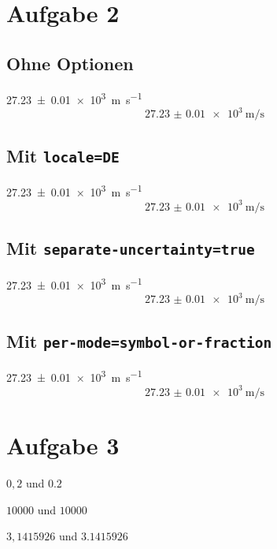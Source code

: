 \documentclass{scrartcl}
\begin{document}
\section*{Aufgabe 2}

\subsection*{Ohne Optionen}

\qty{27.23(1)e3}{\meter\per\second}
\begin{equation}
  \qty{27.23(1)e3}{\meter\per\second}
\end{equation}

\subsection*{Mit \texttt{locale=DE}}

\qty{27.23(1)e3}{\meter\per\second}
\begin{equation}
  \qty{27.23(1)e3}{\meter\per\second}
\end{equation}

\subsection*{Mit \texttt{separate-uncertainty=true}}

\qty{27.23(1)e3}{\meter\per\second}
\begin{equation}
  \qty{27.23(1)e3}{\meter\per\second}
\end{equation}

\subsection*{Mit \texttt{per-mode=symbol-or-fraction}}

\qty{27.23(1)e3}{\meter\per\second}
\begin{equation}
  \qty{27.23(1)e3}{\meter\per\second}
\end{equation}

\section*{Aufgabe 3}

$0,2$ und $\num{0,2}$

$10000$ und $\num{10000}$

$3,1415926$ und $\num{3,1415926}$
\end{document}
